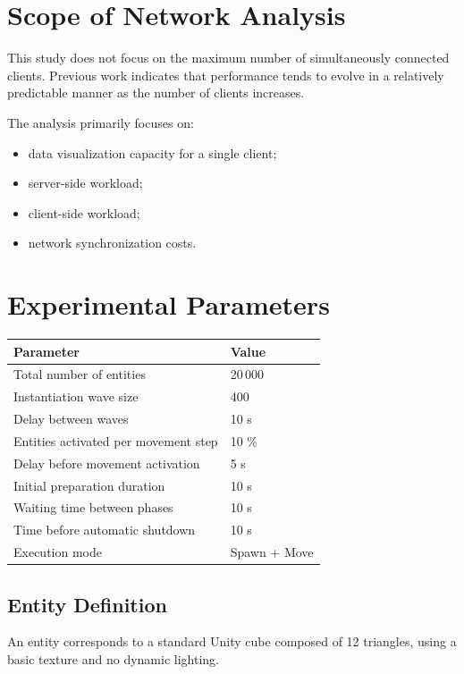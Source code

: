 \documentclass[11pt,a4paper]{article}
\begin{document}
\section{Scope of Network Analysis}

This study does not focus on the maximum number of simultaneously connected clients. Previous work indicates that performance tends to evolve in a relatively predictable manner as the number of clients increases.

The analysis primarily focuses on:

\begin{itemize}
\item data visualization capacity for a single client;
\item server-side workload;
\item client-side workload;
\item network synchronization costs.
\end{itemize}

\section{Experimental Parameters}

\begin{table}[h]
\centering
\begin{tabular}{p{7cm}p{3cm}}
\toprule
Parameter & Value \\
\midrule
Total number of entities & 20\,000 \\
Instantiation wave size & 400 \\
Delay between waves & 10 s \\
Entities activated per movement step & 10 \% \\
Delay before movement activation & 5 s \\
Initial preparation duration & 10 s \\
Waiting time between phases & 10 s \\
Time before automatic shutdown & 10 s \\
Execution mode & Spawn + Move \\
\bottomrule
\end{tabular}
\end{table}

\subsection{Entity Definition}

An entity corresponds to a standard Unity cube composed of 12 triangles, using a basic texture and no dynamic lighting.
\end{document}
